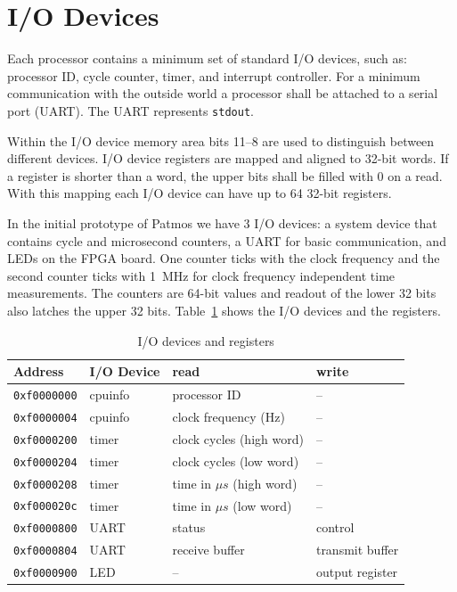 \documentclass[a4paper,fontsize=10pt,twoside,DIV15,BCOR12mm,headinclude=true,footinclude=false,pagesize,bibtotoc]{scrbook}
\newcommand{\code}[1]{{\texttt{#1}}}
\begin{document}
\section{I/O Devices}
\label{sec:iodevs}

Each processor contains a minimum set of standard I/O devices, such as:
processor ID, cycle counter, timer, and interrupt controller. For a minimum
communication with the outside world a processor shall be attached to a
serial port (UART). The UART represents \code{stdout}.

Within the I/O device memory area bits 11--8 are used to distinguish between different devices.
I/O device registers are mapped and aligned to 32-bit words. If a register is shorter than a word,
the upper bits shall be filled with 0 on a read. With this mapping each I/O device can have up to
64 32-bit registers.

In the initial prototype of Patmos we have 3 I/O devices: a system device that contains cycle and microsecond counters, a UART for basic communication, and LEDs
on the FPGA board. One counter ticks with the clock frequency and the second
counter ticks with 1~MHz for clock frequency independent time measurements.
The counters are 64-bit values and readout of the lower 32 bits also latches the
upper 32 bits.
Table~\ref{tab:iomap} shows the I/O devices and the registers.

\begin{table}
\centering
\begin{tabular}{llll}
\toprule
Address & I/O Device & read & write \\
\midrule
\code{0xf0000000} & cpuinfo & processor ID & -- \\
\code{0xf0000004} & cpuinfo & clock frequency (Hz) & -- \\
\code{0xf0000200} & timer & clock cycles (high word) & -- \\
\code{0xf0000204} & timer & clock cycles (low word) & -- \\
\code{0xf0000208} & timer & time in $\mu s$ (high word) & -- \\
\code{0xf000020c} & timer & time in $\mu s$ (low word) & -- \\
\code{0xf0000800} & UART & status & control \\
\code{0xf0000804} & UART & receive buffer & transmit buffer \\
\code{0xf0000900} & LED & -- & output register \\
\bottomrule
\end{tabular}
\caption{I/O devices and registers}
\label{tab:iomap}
\end{table}
\end{document}
